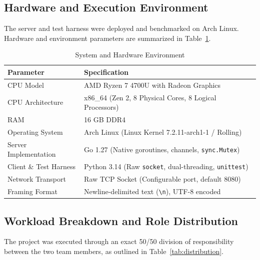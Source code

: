 \documentclass{labreport}
\begin{document}
\subsection{Hardware and Execution Environment}
The server and test harness were deployed and benchmarked on Arch Linux. Hardware and environment parameters are summarized in Table~\ref{tab:hardware}.

\begin{table}[H]
\centering
\caption{System and Hardware Environment}
\label{tab:hardware}
\begin{tabular}{ll}
\toprule
\textbf{Parameter} & \textbf{Specification} \\
\midrule
CPU Model & AMD Ryzen 7 4700U with Radeon Graphics \\
CPU Architecture & x86\_64 (Zen 2, 8 Physical Cores, 8 Logical Processors) \\
RAM & 16 GB DDR4 \\
Operating System & Arch Linux (Linux Kernel 7.2.11-arch1-1 / Rolling) \\
Server Implementation & Go 1.27 (Native goroutines, channels, \texttt{sync.Mutex}) \\
Client \& Test Harness & Python 3.14 (Raw \texttt{socket}, dual-threading, \texttt{unittest}) \\
Network Transport & Raw TCP Socket (Configurable port, default 8080) \\
Framing Format & Newline-delimited text (\texttt{\textbackslash n}), UTF-8 encoded \\
\bottomrule
\end{tabular}
\end{table}

\subsection{Workload Breakdown and Role Distribution}
The project was executed through an exact 50/50 division of responsibility between the two team members, as outlined in Table~\ref{tab:distribution}.

\begin{table}[H]
\centering
\caption{Team Responsibility and Task Matrix}
\label{tab:distribution}
\end{table}
\end{document}

